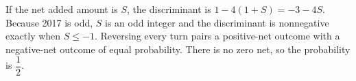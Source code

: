 If the net added amount is $ S $, the discriminant is $ 1-4(1+S)=-3-4S $. Because 2017 is odd, $ S $ is an odd integer and the discriminant is nonnegative exactly when $ S\le-1 $. Reversing every turn pairs a positive-net outcome with a negative-net outcome of equal probability. There is no zero net, so the probability is $\boxed{\dfrac{1}{2}}$.
